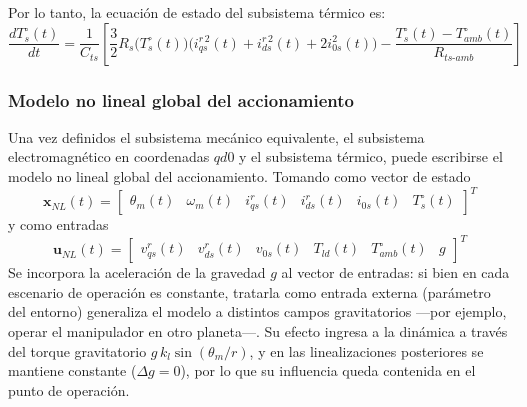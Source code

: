 \documentclass[12pt, a4paper,journal, onecolumn, compsoc]{IEEEtran}
\begin{document}
    Por lo tanto, la ecuación de estado del subsistema térmico es:
    \begin{equation}
        \frac{dT_s^\circ(t)}{dt}=\frac{1}{C_{ts}}\left[\frac{3}{2}R_s\big(T_s^\circ(t)\big)\Big(i_{qs}^{r\,2}(t)+i_{ds}^{r\,2}(t)+2i_{0s}^{2}(t)\Big)-\frac{T_s^\circ(t)-T_{amb}^\circ(t)}{R_{ts\text{-}amb}}\right]
    \end{equation}

    \subsubsection{Modelo no lineal global del accionamiento}
    Una vez definidos el subsistema mecánico equivalente, el subsistema electromagnético en coordenadas \(qd0\) y el subsistema térmico, puede escribirse el modelo no lineal global del accionamiento. Tomando como vector de estado
    \[
        \bm{x}_{NL}(t)=\begin{bmatrix}
            \theta_m(t) & \omega_m(t) & i_{qs}^r(t) & i_{ds}^r(t) & i_{0s}(t) & T_s^\circ(t)
        \end{bmatrix}^T
    \]
    y como entradas
    \[
        \bm{u}_{NL}(t)=\begin{bmatrix}
            v_{qs}^r(t) & v_{ds}^r(t) & v_{0s}(t) & T_{ld}(t) & T_{amb}^\circ(t) & g
        \end{bmatrix}^T
    \]
    Se incorpora la aceleración de la gravedad $g$ al vector de entradas: si bien en cada escenario de operación es constante, tratarla como entrada externa (parámetro del entorno) generaliza el modelo a distintos campos gravitatorios ---por ejemplo, operar el manipulador en otro planeta---. Su efecto ingresa a la dinámica a través del torque gravitatorio $g\,k_l\sin(\theta_m/r)$, y en las linealizaciones posteriores se mantiene constante ($\Delta g = 0$), por lo que su influencia queda contenida en el punto de operación.
\end{document}

